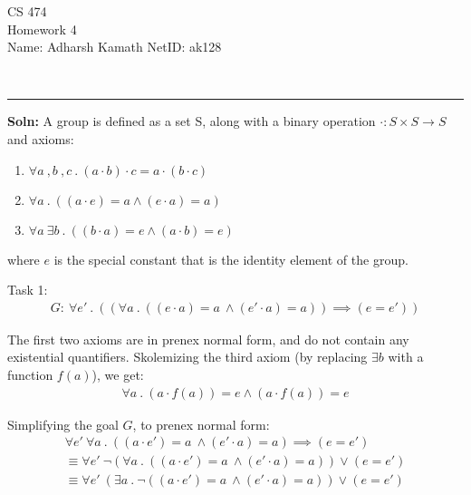 \documentclass[12pt,letterpaper, onecolumn]{exam}
\begin{document}
\begingroup
\centering
\LARGE CS 474\\
\large Homework 4 \\[0.5em]
\endgroup
\begingroup
\normalsize \quad\quad\quad Name: Adharsh Kamath \quad\quad\quad \quad\quad\quad \quad\quad\quad \quad\quad\quad \quad  NetID: ak128 \par\
\endgroup
\rule{17cm}{0.4pt}
\pointsdroppedatright   %
\printanswers
\renewcommand{\solutiontitle}{\noindent\textbf{Soln:}\enspace}
\newcommand{\cheading}[1]{{\underline{\textit{#1}}}}

\renewcommand{\questionshook}{%
	\setlength{\leftmargin}{18pt}%
	\setlength{\labelwidth}{-\labelsep}%
}
\begin{questions}
	\question[]
	\solutiontitle
	A group is defined as a set S, along with a binary operation $ \cdot : S \times S \rightarrow S $ and axioms:
	\begin{enumerate}
		\item $\forall a \:,  b \:, c \:.\: (a \cdot b) \cdot c = a \cdot (b \cdot c)$
		\item $\forall a \:.\: ((a \cdot e) = a \land (e \cdot a) = a) $
		\item $\forall a \: \exists b \:.\: ((b \cdot a) = e \land (a \cdot b) = e)$
	\end{enumerate}

	where $ e $  is the special constant that is the identity element of the group.

	Task 1: 
	\begin{align*}
		G : \: \forall e' \:.\: ((\forall a \:.\: ((e \cdot a) = a \: \land (e' \cdot a) = a)) \implies (e = e'))
	\end{align*}

	The first two axioms are in prenex normal form, and do not contain any existential quantifiers.
	Skolemizing the third axiom (by replacing $ \exists b $ with a function $ f(a) $), we get:
	\begin{align*}
		\forall a \:.\: (a \cdot f(a)) = e \land (a \cdot f(a)) = e
	\end{align*}

	Simplifying the goal $G$, to prenex normal form:
	\begin{align*}
		\forall e' \: \forall a \:.\: ((a \cdot e') = a \: \land (e' \cdot a) = a) \implies (e = e') \\
		\equiv \forall e' \: \neg(\forall a \:.\: ((a \cdot e') = a \: \land (e' \cdot a) = a)) \lor (e = e') \\
		\equiv \forall e' \: (\exists a \:.\: \neg((a \cdot e') = a \: \land (e' \cdot a) = a)) \lor (e = e')
	\end{align*}


\end{questions}
\end{document}
